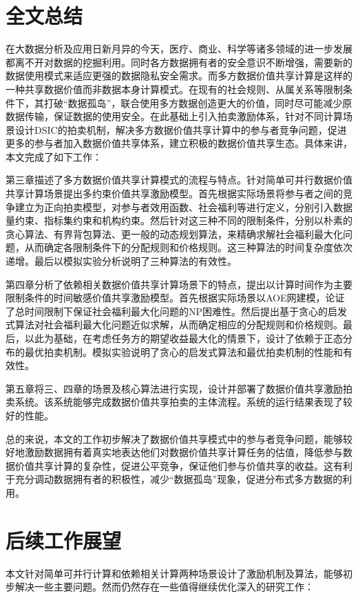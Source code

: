 \documentclass[promaster]{thesis-uestc}
\begin{document}
\section{全文总结}
在大数据分析及应用日新月异的今天，医疗、商业、科学等诸多领域的进一步发展都离不开对数据的挖掘利用。同时各方数据拥有者的安全意识不断增强，需要新的数据使用模式来适应更强的数据隐私安全需求。而多方数据价值共享计算是这样的一种共享数据价值而非数据本身计算模式。在现有的社会规则、从属关系等限制条件下，其打破“数据孤岛”，联合使用多方数据创造更大的价值，同时尽可能减少原数据传输，保证数据的使用安全。在此基础上引入拍卖激励体系，针对不同计算场景设计DSIC的拍卖机制，解决多方数据价值共享计算中的参与者竞争问题，促进更多的参与者加入数据价值共享体系，建立积极的数据价值共享生态。具体来讲，本文完成了如下工作：

第三章描述了多方数据价值共享计算模式的流程与特点。针对简单可并行数据价值共享计算场景提出多约束价值共享激励模型。首先根据实际场景将参与者之间的竞争建立为正向拍卖模型，对参与者效用函数、社会福利等进行定义，分别引入数据量约束、指标集约束和机构约束。然后针对这三种不同的限制条件，分别以朴素的贪心算法、有界背包算法、更一般的动态规划算法，来精确求解社会福利最大化问题，从而确定各限制条件下的分配规则和价格规则。这三种算法的时间复杂度依次递增。最后以模拟实验分析说明了三种算法的有效性。

第四章分析了依赖相关数据价值共享计算场景下的特点，提出以计算时间作为主要限制条件的时间敏感价值共享激励模型。首先根据实际场景以AOE网建模，论证了总时间限制下保证社会福利最大化问题的NP困难性。然后提出基于贪心的启发式算法对社会福利最大化问题近似求解，从而确定相应的分配规则和价格规则。最后，以此为基础，在考虑任务方的期望收益最大化的情景下，设计了依赖于正态分布的最优拍卖机制。模拟实验说明了贪心的启发式算法和最优拍卖机制的性能和有效性。

第五章将三、四章的场景及核心算法进行实现，设计并部署了数据价值共享激励拍卖系统。该系统能够完成数据价值共享拍卖的主体流程。系统的运行结果表现了较好的性能。

总的来说，本文的工作初步解决了数据价值共享模式中的参与者竞争问题，能够较好地激励数据拥有着真实地表达他们对数据价值共享计算任务的估值，降低参与数据价值共享计算的复杂性，促进公平竞争，保证他们参与价值共享的收益。这有利于充分调动数据拥有者的积极性，减少“数据孤岛”现象，促进分布式多方数据的利用。

\section{后续工作展望}
本文针对简单可并行计算和依赖相关计算两种场景设计了激励机制及算法，能够初步解决一些主要问题。然而仍然存在一些值得继续优化深入的研究工作：
\end{document}
